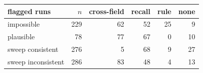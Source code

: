 \begin{tabular}{lrrrrr}
\toprule
flagged runs & $n$ & cross-field & recall & rule & none \\
\midrule
impossible & 229 & 62 & 52 & 25 & 9 \\
plausible & 78 & 77 & 67 & 0 & 10 \\
sweep consistent & 276 & 5 & 68 & 9 & 27 \\
sweep inconsistent & 286 & 83 & 48 & 4 & 13 \\
\bottomrule
\end{tabular}
